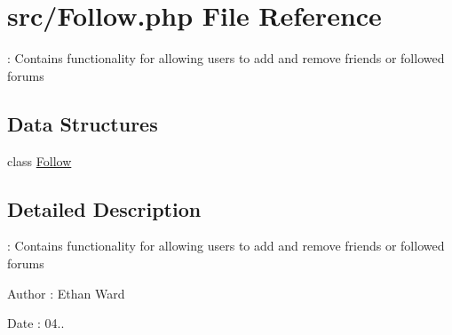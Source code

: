 \hypertarget{_follow_8php}{}\section{src/\+Follow.php File Reference}
\label{_follow_8php}


\+: Contains functionality for allowing users to add and remove friends or followed forums  


\subsection*{Data Structures}
\begin{DoxyCompactItemize}
\item 
class \hyperlink{class_follow}{Follow}
\end{DoxyCompactItemize}


\subsection{Detailed Description}
\+: Contains functionality for allowing users to add and remove friends or followed forums 

\begin{DoxyAuthor}{Author}
\+: Ethan Ward 
\end{DoxyAuthor}
\begin{DoxyDate}{Date}
\+: 04.. 
\end{DoxyDate}

